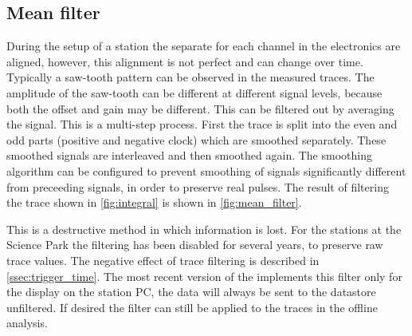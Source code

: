 

\subsection{Mean filter}
\label{ssec:mean_filter}

During the setup of a station the separate \adcs for each channel in the \hisparc electronics are aligned, however, this alignment is not perfect and can change over time. Typically a saw-tooth pattern can be observed in the measured traces. The amplitude of the saw-tooth can be different at different signal levels, because both the offset and gain may be different. This can be filtered out by averaging the signal. This is a multi-step process. First the trace is split into the even and odd parts (positive and negative clock) which are smoothed separately. These smoothed signals are interleaved and then smoothed again. The smoothing algorithm can be configured to prevent smoothing of signals significantly different from preceeding signals, in order to preserve real pulses. The result of filtering the trace shown in \cref{fig:integral} is shown in \cref{fig:mean_filter}.

This is a destructive method in which information is lost. For the \hisparc stations at the Science Park the filtering has been disabled for several years, to preserve raw trace values. The negative effect of trace filtering is described in \cref{ssec:trigger_time}. The most recent version of the \hisparc \daq implements this filter only for the display on the \hisparc station PC, the data will always be sent to the datastore unfiltered. If desired the filter can still be applied to the traces in the offline analysis.

